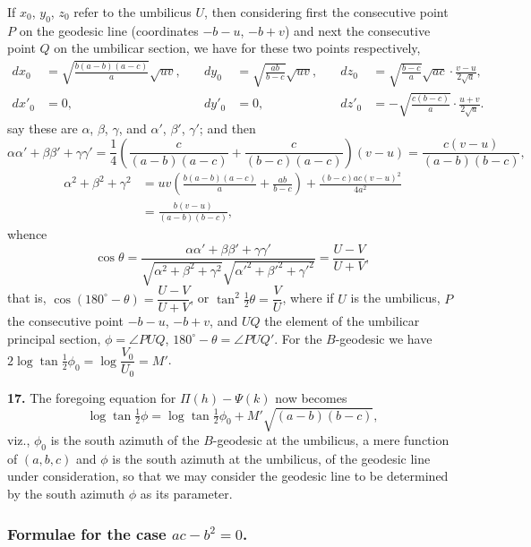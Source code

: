 \documentclass[11pt,a4paper]{article}
\begin{document}
If $x_{0}$, $y_{0}$, $z_{0}$ refer to the umbilicus $U$, then considering first the consecutive point $P$ on the geodesic line (coordinates $-b-u$, $-b+v$) and next the consecutive point $Q$ on the umbilicar section, we have for these two points respectively,
\begin{align*}
dx_{0} &= \sqrt{\frac{b(a-b)(a-c)}{a}} \sqrt{uv}, \quad &dy_{0} &= \sqrt{\frac{ab}{b-c}} \sqrt{uv}, \quad &dz_{0} &= \sqrt{\frac{b-c}{a}} \sqrt{ac} \cdot \frac{v-u}{2\sqrt{a}}, \\
dx'_{0} &= 0, \quad &dy'_{0} &= 0, \quad &dz'_{0} &= -\sqrt{\frac{c(b-c)}{a}} \cdot \frac{u+v}{2\sqrt{a}}.
\end{align*}
say these are $\alpha$, $\beta$, $\gamma$, and $\alpha'$, $\beta'$, $\gamma'$; and then
\[
\alpha\alpha' + \beta\beta' + \gamma\gamma' = \frac{1}{4}\left( \frac{c}{(a-b)(a-c)} + \frac{c}{(b-c)(a-c)} \right)(v-u) = \frac{c(v-u)}{(a-b)(b-c)},
\]
\begin{align*}
\alpha^{2} + \beta^{2} + \gamma^{2} &= uv \left( \frac{b(a-b)(a-c)}{a} + \frac{ab}{b-c} \right) + \frac{(b-c)ac(v-u)^{2}}{4a^{2}} \\
&= \frac{b(v-u)}{(a-b)(b-c)},
\end{align*}
whence
\[
\cos \theta = \frac{\alpha\alpha' + \beta\beta' + \gamma\gamma'}{\sqrt{\alpha^{2}+\beta^{2}+\gamma^{2}}\sqrt{\alpha'^{2}+\beta'^{2}+\gamma'^{2}}} = \frac{U-V}{U+V},
\]
that is, $\cos(180^{\circ} - \theta) = \dfrac{U-V}{U+V}$, or $\tan^{2}\tfrac{1}{2}\theta = \dfrac{V}{U}$, where if $U$ is the umbilicus, $P$ the consecutive point $-b-u$, $-b+v$, and $UQ$ the element of the umbilicar principal section, $\phi = \angle PUQ$, $180^{\circ} - \theta = \angle PUQ'$. For the $B$-geodesic we have $2\log \tan \tfrac{1}{2}\phi_{0} = \log \dfrac{V_{0}}{U_{0}} = M'$.

\noindent\textbf{17.} The foregoing equation for $\Pi(h) - \Psi(k)$ now becomes
\[
\log \tan \tfrac{1}{2}\phi = \log \tan \tfrac{1}{2}\phi_{0} + M' \sqrt{(a-b)(b-c)},
\]
viz., $\phi_{0}$ is the south azimuth of the $B$-geodesic at the umbilicus, a mere function of $(a, b, c)$ and $\phi$ is the south azimuth at the umbilicus, of the geodesic line under consideration, so that we may consider the geodesic line to be determined by the south azimuth $\phi$ as its parameter.

\subsubsection*{Formulae for the case $ac - b^{2} = 0$.}
\end{document}
